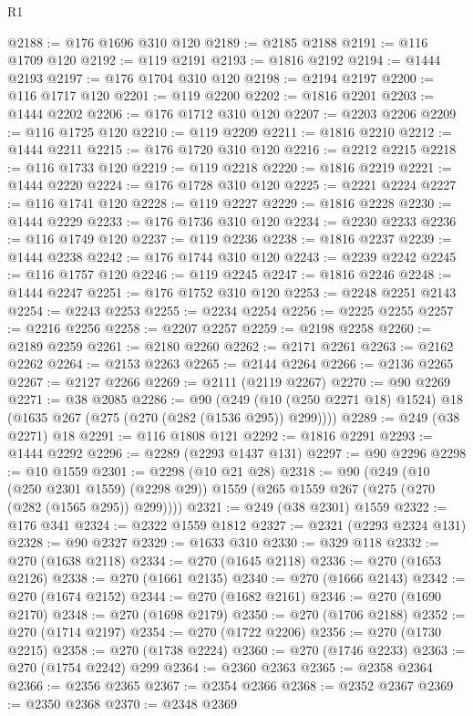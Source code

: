 \begin{lexlean}{R1}
\begin{coremodule}
@2188 := @176 @1696 @310 @120
@2189 := @2185 @2188
@2191 := @116 @1709 @120
@2192 := @119 @2191
@2193 := @1816 @2192
@2194 := @1444 @2193
@2197 := @176 @1704 @310 @120
@2198 := @2194 @2197
@2200 := @116 @1717 @120
@2201 := @119 @2200
@2202 := @1816 @2201
@2203 := @1444 @2202
@2206 := @176 @1712 @310 @120
@2207 := @2203 @2206
@2209 := @116 @1725 @120
@2210 := @119 @2209
@2211 := @1816 @2210
@2212 := @1444 @2211
@2215 := @176 @1720 @310 @120
@2216 := @2212 @2215
@2218 := @116 @1733 @120
@2219 := @119 @2218
@2220 := @1816 @2219
@2221 := @1444 @2220
@2224 := @176 @1728 @310 @120
@2225 := @2221 @2224
@2227 := @116 @1741 @120
@2228 := @119 @2227
@2229 := @1816 @2228
@2230 := @1444 @2229
@2233 := @176 @1736 @310 @120
@2234 := @2230 @2233
@2236 := @116 @1749 @120
@2237 := @119 @2236
@2238 := @1816 @2237
@2239 := @1444 @2238
@2242 := @176 @1744 @310 @120
@2243 := @2239 @2242
@2245 := @116 @1757 @120
@2246 := @119 @2245
@2247 := @1816 @2246
@2248 := @1444 @2247
@2251 := @176 @1752 @310 @120
@2253 := @2248 @2251 @2143
@2254 := @2243 @2253
@2255 := @2234 @2254
@2256 := @2225 @2255
@2257 := @2216 @2256
@2258 := @2207 @2257
@2259 := @2198 @2258
@2260 := @2189 @2259
@2261 := @2180 @2260
@2262 := @2171 @2261
@2263 := @2162 @2262
@2264 := @2153 @2263
@2265 := @2144 @2264
@2266 := @2136 @2265
@2267 := @2127 @2266
@2269 := @2111 (@2119 @2267)
@2270 := @90 @2269
@2271 := @38 @2085
@2286 := @90
    (@249 (@10 (@250 @2271 @18) @1524) @18 (@1635 @267 (@275 (@270 (@282 (@1536 @295)) @299))))
@2289 := @249 (@38 @2271) @18
@2291 := @116 @1808 @121
@2292 := @1816 @2291
@2293 := @1444 @2292
@2296 := @2289 (@2293 @1437 @131)
@2297 := @90 @2296
@2298 := @10 @1559
@2301 := @2298 (@10 @21 @28)
@2318 := @90
    (@249
      (@10 (@250 @2301 @1559) (@2298 @29))
      @1559
      (@265 @1559 @267 (@275 (@270 (@282 (@1565 @295)) @299))))
@2321 := @249 (@38 @2301) @1559
@2322 := @176 @341
@2324 := @2322 @1559 @1812
@2327 := @2321 (@2293 @2324 @131)
@2328 := @90 @2327
@2329 := @1633 @310
@2330 := @329 @118
@2332 := @270 (@1638 @2118)
@2334 := @270 (@1645 @2118)
@2336 := @270 (@1653 @2126)
@2338 := @270 (@1661 @2135)
@2340 := @270 (@1666 @2143)
@2342 := @270 (@1674 @2152)
@2344 := @270 (@1682 @2161)
@2346 := @270 (@1690 @2170)
@2348 := @270 (@1698 @2179)
@2350 := @270 (@1706 @2188)
@2352 := @270 (@1714 @2197)
@2354 := @270 (@1722 @2206)
@2356 := @270 (@1730 @2215)
@2358 := @270 (@1738 @2224)
@2360 := @270 (@1746 @2233)
@2363 := @270 (@1754 @2242) @299
@2364 := @2360 @2363
@2365 := @2358 @2364
@2366 := @2356 @2365
@2367 := @2354 @2366
@2368 := @2352 @2367
@2369 := @2350 @2368
@2370 := @2348 @2369

\end{coremodule}
\end{lexlean}
